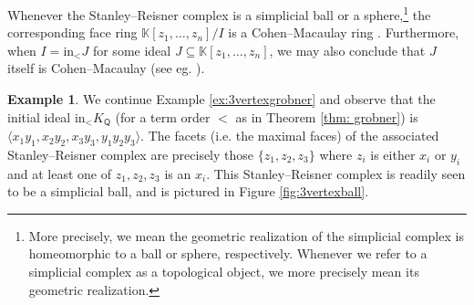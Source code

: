 \documentclass[10pt]{amsart}
\numberwithin{equation}{section}
\theoremstyle{definition}
\newtheorem{ex}[thm]{Example}
\theoremstyle{remark}
\newcommand{\1}{^{-1}}
\def\Q{\mathsf{Q}}
\begin{document}
Whenever the Stanley--Reisner complex is a simplicial ball or a sphere,\footnote{More precisely, we mean the geometric realization of the simplicial complex is homeomorphic to a ball or sphere, respectively.  Whenever we refer to a simplicial complex as a topological object, we more precisely mean its geometric realization.} the corresponding face ring $\mathbb{K}[z_1,\dots, z_n]/I$ is a Cohen--Macaulay ring \cite{Munkres}. Furthermore, when $I = \textrm{in}_< J$ for some ideal $J\subseteq \mathbb{K}[z_1,\dots, z_n]$, we may also conclude that $J$ itself is Cohen--Macaulay (see eg. \cite[Proposition 3.1]{BC03}).

\begin{ex}
We continue Example \ref{ex:3vertexgrobner} and observe that the initial ideal $\textrm{in}_< K_\Q$ (for a term order $<$ as in Theorem \ref{thm: grobner}) is $\langle x_1y_1, x_2y_2, x_3y_3, y_1y_2y_3\rangle$. The facets (i.e. the maximal faces) of the associated Stanley--Reisner complex are precisely those $\{z_1,z_2,z_3\}$ where $z_i$ is either $x_i$ or $y_i$ and at least one of $z_1, z_2, z_3$ is an $x_i$. This Stanley--Reisner complex is readily seen to be a simplicial ball, and is pictured in Figure \ref{fig:3vertexball}.

\begin{figure}


\end{figure}
\end{ex}
\end{document}
